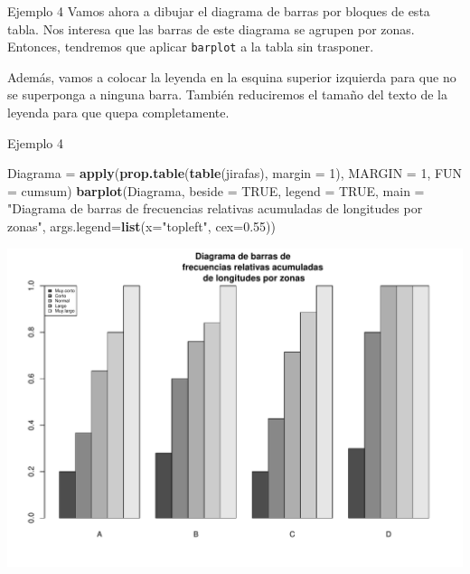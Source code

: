 \documentclass[
  ignorenonframetext,
]{beamer}
\newenvironment{Shaded}{\begin{snugshade}}{\end{snugshade}}
\newcommand{\AttributeTok}[1]{\textcolor[rgb]{0.13,0.29,0.53}{#1}}
\newcommand{\ConstantTok}[1]{\textcolor[rgb]{0.56,0.35,0.01}{#1}}
\newcommand{\DecValTok}[1]{\textcolor[rgb]{0.00,0.00,0.81}{#1}}
\newcommand{\FloatTok}[1]{\textcolor[rgb]{0.00,0.00,0.81}{#1}}
\newcommand{\FunctionTok}[1]{\textcolor[rgb]{0.13,0.29,0.53}{\textbf{#1}}}
\newcommand{\NormalTok}[1]{#1}
\newcommand{\OtherTok}[1]{\textcolor[rgb]{0.56,0.35,0.01}{#1}}
\newcommand{\StringTok}[1]{\textcolor[rgb]{0.31,0.60,0.02}{#1}}
\begin{document}
\begin{frame}[fragile]{Ejemplo 4}
\label{ejemplo-4-5}
Vamos ahora a dibujar el diagrama de barras por bloques de esta tabla.
Nos interesa que las barras de este diagrama se agrupen por zonas.
Entonces, tendremos que aplicar \texttt{barplot} a la tabla sin
trasponer.

Además, vamos a colocar la leyenda en la esquina superior izquierda para
que no se superponga a ninguna barra. También reduciremos el tamaño del
texto de la leyenda para que quepa completamente.
\end{frame}

\begin{frame}[fragile]{Ejemplo 4}
\label{ejemplo-4-6}
\begin{Shaded}
\begin{Highlighting}[]
\NormalTok{Diagrama }\OtherTok{=} \FunctionTok{apply}\NormalTok{(}\FunctionTok{prop.table}\NormalTok{(}\FunctionTok{table}\NormalTok{(jirafas), }\AttributeTok{margin =} \DecValTok{1}\NormalTok{),}
                 \AttributeTok{MARGIN =} \DecValTok{1}\NormalTok{, }\AttributeTok{FUN =}\NormalTok{ cumsum)}
\FunctionTok{barplot}\NormalTok{(Diagrama, }\AttributeTok{beside =} \ConstantTok{TRUE}\NormalTok{, }\AttributeTok{legend =} \ConstantTok{TRUE}\NormalTok{,}
\AttributeTok{main =} \StringTok{"Diagrama de barras de }
\StringTok{        frecuencias relativas acumuladas }
\StringTok{        de longitudes por zonas"}\NormalTok{,}
\AttributeTok{args.legend=}\FunctionTok{list}\NormalTok{(}\AttributeTok{x=}\StringTok{"topleft"}\NormalTok{, }\AttributeTok{cex=}\FloatTok{0.55}\NormalTok{))}
\end{Highlighting}
\end{Shaded}

\begin{center}\includegraphics[width=0.5\linewidth]{R_base_files/figure-beamer/unnamed-chunk-125-1} \end{center}
\end{frame}
\end{document}
